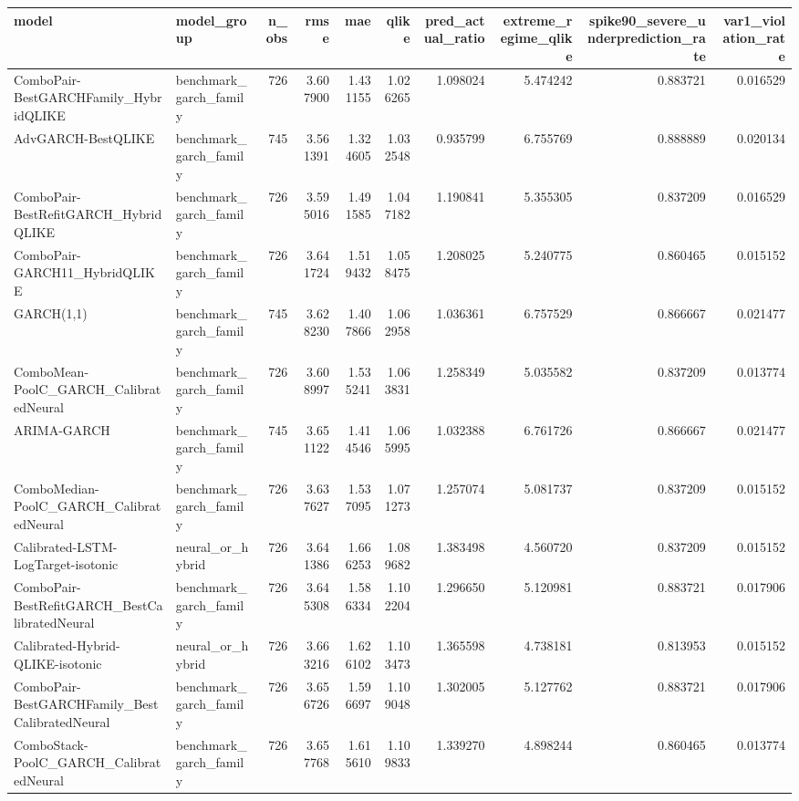 \begin{tabular}{l l r r r r r r r r}
\hline
model & model\_group & n\_obs & rmse & mae & qlike & pred\_actual\_ratio & extreme\_regime\_qlike & spike90\_severe\_underprediction\_rate & var1\_violation\_rate \\
\hline
ComboPair-BestGARCHFamily\_HybridQLIKE & benchmark\_garch\_family & 726 & 3.607900 & 1.431155 & 1.026265 & 1.098024 & 5.474242 & 0.883721 & 0.016529 \\
AdvGARCH-BestQLIKE & benchmark\_garch\_family & 745 & 3.561391 & 1.324605 & 1.032548 & 0.935799 & 6.755769 & 0.888889 & 0.020134 \\
ComboPair-BestRefitGARCH\_HybridQLIKE & benchmark\_garch\_family & 726 & 3.595016 & 1.491585 & 1.047182 & 1.190841 & 5.355305 & 0.837209 & 0.016529 \\
ComboPair-GARCH11\_HybridQLIKE & benchmark\_garch\_family & 726 & 3.641724 & 1.519432 & 1.058475 & 1.208025 & 5.240775 & 0.860465 & 0.015152 \\
GARCH(1,1) & benchmark\_garch\_family & 745 & 3.628230 & 1.407866 & 1.062958 & 1.036361 & 6.757529 & 0.866667 & 0.021477 \\
ComboMean-PoolC\_GARCH\_CalibratedNeural & benchmark\_garch\_family & 726 & 3.608997 & 1.535241 & 1.063831 & 1.258349 & 5.035582 & 0.837209 & 0.013774 \\
ARIMA-GARCH & benchmark\_garch\_family & 745 & 3.651122 & 1.414546 & 1.065995 & 1.032388 & 6.761726 & 0.866667 & 0.021477 \\
ComboMedian-PoolC\_GARCH\_CalibratedNeural & benchmark\_garch\_family & 726 & 3.637627 & 1.537095 & 1.071273 & 1.257074 & 5.081737 & 0.837209 & 0.015152 \\
Calibrated-LSTM-LogTarget-isotonic & neural\_or\_hybrid & 726 & 3.641386 & 1.666253 & 1.089682 & 1.383498 & 4.560720 & 0.837209 & 0.015152 \\
ComboPair-BestRefitGARCH\_BestCalibratedNeural & benchmark\_garch\_family & 726 & 3.645308 & 1.586334 & 1.102204 & 1.296650 & 5.120981 & 0.883721 & 0.017906 \\
Calibrated-Hybrid-QLIKE-isotonic & neural\_or\_hybrid & 726 & 3.663216 & 1.626102 & 1.103473 & 1.365598 & 4.738181 & 0.813953 & 0.015152 \\
ComboPair-BestGARCHFamily\_BestCalibratedNeural & benchmark\_garch\_family & 726 & 3.656726 & 1.596697 & 1.109048 & 1.302005 & 5.127762 & 0.883721 & 0.017906 \\
ComboStack-PoolC\_GARCH\_CalibratedNeural & benchmark\_garch\_family & 726 & 3.657768 & 1.615610 & 1.109833 & 1.339270 & 4.898244 & 0.860465 & 0.013774 \\

\end{tabular}
